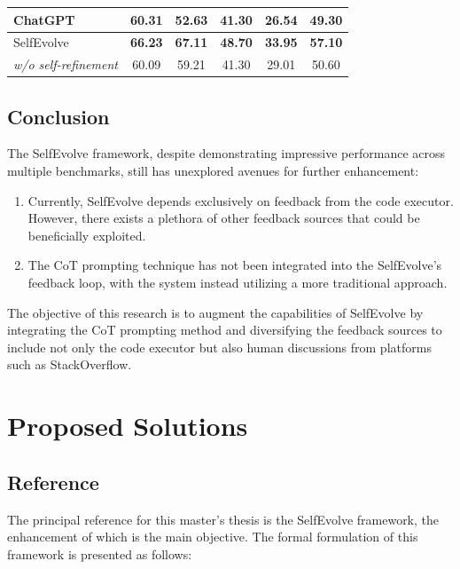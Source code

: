 \documentclass[a4paper,oneside]{book}
\begin{document}
\begin{table}[H]
\begin{center}
\begin{tabular}{|lccccc|}
            \multicolumn{1}{|l|}{ChatGPT}                          & \multicolumn{1}{c|}{60.31}                 & \multicolumn{1}{c|}{52.63}          & \multicolumn{1}{c|}{41.30}          & \multicolumn{1}{c|}{26.54}          & 49.30          \\ \hline
            \multicolumn{1}{|l|}{SelfEvolve}                       & \multicolumn{1}{c|}{\textbf{66.23}}        & \multicolumn{1}{c|}{\textbf{67.11}} & \multicolumn{1}{c|}{\textbf{48.70}} & \multicolumn{1}{c|}{\textbf{33.95}} & \textbf{57.10} \\ \hline
            \multicolumn{1}{|r|}{\textit{w/o self-refinement}}     & \multicolumn{1}{c|}{60.09}                 & \multicolumn{1}{c|}{59.21}          & \multicolumn{1}{c|}{41.30}          & \multicolumn{1}{c|}{29.01}          & 50.60          \\ \hline
        \end{tabular}
    \end{center}
\end{table}

\section{Conclusion}
The SelfEvolve framework, despite demonstrating impressive performance across multiple benchmarks, still has unexplored avenues for further enhancement:

\begin{enumerate}
    \item Currently, SelfEvolve depends exclusively on feedback from the code executor. However, there exists a plethora of other feedback sources that could be beneficially exploited.

    \item The CoT prompting technique has not been integrated into the SelfEvolve's feedback loop, with the system instead utilizing a more traditional approach.
\end{enumerate}

The objective of this research is to augment the capabilities of SelfEvolve by integrating the CoT prompting method and diversifying the feedback sources to include not only the code executor but also human discussions from platforms such as StackOverflow.

\chapter{Proposed Solutions}
\section{Reference}
The principal reference for this master's thesis is the SelfEvolve framework, the enhancement of which is the main objective. The formal formulation of this framework is presented as follows:
\end{document}
